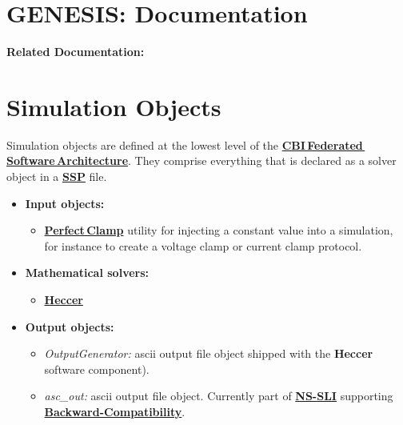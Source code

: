 \documentclass[12pt]{article}
\begin{document}
\section*{GENESIS: Documentation}

{\bf Related Documentation:}

\section*{Simulation Objects}

Simulation objects are defined at the lowest level of the
\href{../genesis-overview/genesis-overview.tex}{\bf
  CBI\,Federated\,Software\,Architecture}.  They comprise everything
that is declared as a solver object in a \href{../ssp/ssp.tex}{\bf
  SSP} file.

\begin{itemize}

\item {\bf Input objects:}
   \begin{itemize}
   \item \href{../pclamp/pclamp.tex}{\bf Perfect\,Clamp} utility for
     injecting a constant value into a simulation, for instance to
     create a voltage clamp or current clamp protocol.
   \end{itemize}
   
\item{\bf Mathematical solvers:}
   \begin{itemize}
      \item \href{../heccer/heccer.tex}{\bf Heccer}
   \end{itemize}
   
\item {\bf Output objects:}
   \begin{itemize}
   \item {\it OutputGenerator:} ascii output file object shipped with
     the {\bf Heccer} software component).
   \item {\it asc\_out:} ascii output file object.  Currently part of
     \href{../ns-sli/ns-sli.tex}{\bf NS-SLI} supporting
     \href{../backward-compatibility/backward-compatibility.tex}{\bf
       Backward-Compatibility}.
   \end{itemize}

\end{itemize}
\end{document}
